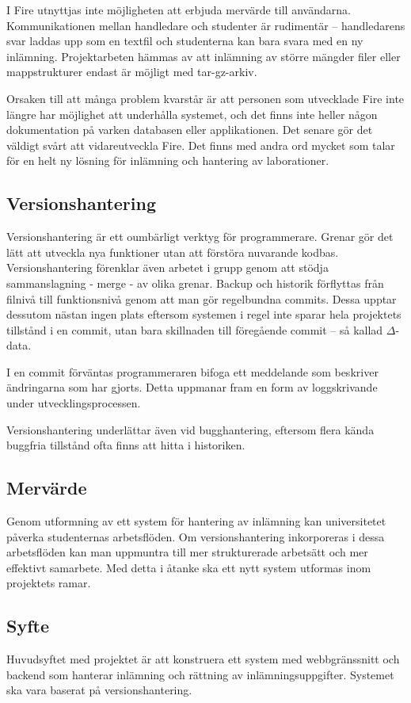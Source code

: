 I Fire utnyttjas inte möjligheten att erbjuda mervärde till användarna.
Kommunikationen mellan handledare och studenter är rudimentär – handledarens
svar laddas upp som en textfil och studenterna kan bara svara med en ny
inlämning. Projektarbeten hämmas av att inlämning av större mängder filer eller
mappstrukturer endast är möjligt med tar-gz-arkiv.

Orsaken till att många problem kvarstår är att personen som utvecklade Fire inte
längre har möjlighet att underhålla systemet, och det finns inte heller någon
dokumentation på varken databasen eller applikationen. Det senare gör det
väldigt svårt att vidareutveckla Fire.
Det finns med andra ord mycket som talar för en helt ny lösning för inlämning
och hantering av laborationer.

\subsection{Versionshantering}

Versionshantering är ett oumbärligt verktyg för programmerare. Grenar gör det
lätt att utveckla nya funktioner utan att förstöra nuvarande kodbas.
Versionshantering förenklar även arbetet i grupp genom att  stödja
sammanslagning - merge - av olika grenar. Backup och historik förflyttas från
filnivå till funktionsnivå genom att man gör regelbundna commits. Dessa upptar
dessutom nästan ingen plats eftersom systemen i regel inte sparar hela
projektets tillstånd i en commit, utan bara skillnaden till föregående commit –
så kallad $\Delta$-data.

I en commit förväntas programmeraren bifoga ett meddelande som beskriver
ändringarna som har gjorts. Detta uppmanar fram en form av loggskrivande under
utvecklingsprocessen.

Versionshantering underlättar även vid bugghantering, eftersom flera kända
buggfria tillstånd ofta finns att hitta i historiken.

\subsection{Mervärde}
Genom utformning av ett system för hantering av inlämning kan universitetet
påverka studenternas arbetsflöden. Om versionshantering inkorporeras i dessa
arbetsflöden kan man uppmuntra till mer strukturerade arbetsätt och mer
effektivt samarbete.
Med detta i åtanke ska ett nytt system utformas inom projektets ramar.
\subsection{Syfte}
Huvudsyftet med projektet är att konstruera ett system med webbgränssnitt och
backend som hanterar inlämning och rättning av inlämningsuppgifter. Systemet ska
vara baserat på versionshantering.


